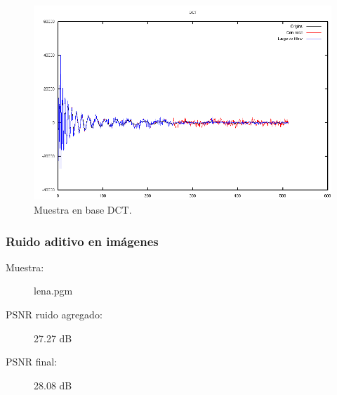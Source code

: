 \documentclass[a4paper,10pt,twoside]{article}
\begin{document}
\begin{figure}[H]
  \centering
  \includegraphics[width=15cm]{graficos/dopp_aditivo_umbralizar_dct.png} 
  \caption{Muestra en base DCT.}
\end{figure}


\subsubsection{Ruido aditivo en imágenes}

\begin{description}
  \item[Muestra:] lena.pgm
  \item[PSNR ruido agregado:] 27.27 dB
  \item[PSNR final:] 28.08 dB
\end{description}
\end{document}
